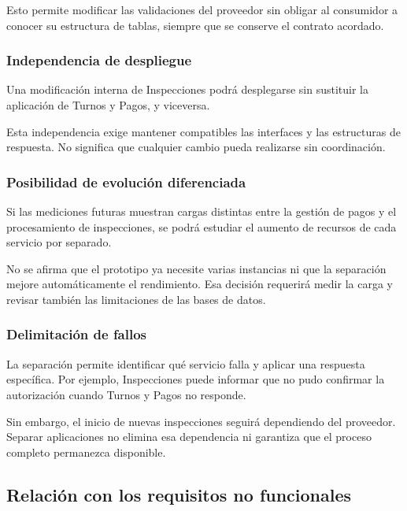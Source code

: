 \documentclass[11pt,a4paper]{article}
\begin{document}
	Esto permite modificar las validaciones del proveedor sin obligar al consumidor a conocer su estructura de tablas, siempre que se conserve el contrato acordado.
	
	\subsubsection{Independencia de despliegue}
	
	Una modificación interna de Inspecciones podrá desplegarse sin sustituir la aplicación de Turnos y Pagos, y viceversa.
	
	Esta independencia exige mantener compatibles las interfaces y las estructuras de respuesta. No significa que cualquier cambio pueda realizarse sin coordinación.
	
	\subsubsection{Posibilidad de evolución diferenciada}
	
	Si las mediciones futuras muestran cargas distintas entre la gestión de pagos y el procesamiento de inspecciones, se podrá estudiar el aumento de recursos de cada servicio por separado.
	
	No se afirma que el prototipo ya necesite varias instancias ni que la separación mejore automáticamente el rendimiento. Esa decisión requerirá medir la carga y revisar también las limitaciones de las bases de datos.
	
	\subsubsection{Delimitación de fallos}
	
	La separación permite identificar qué servicio falla y aplicar una respuesta específica. Por ejemplo, Inspecciones puede informar que no pudo confirmar la autorización cuando Turnos y Pagos no responde.
	
	Sin embargo, el inicio de nuevas inspecciones seguirá dependiendo del proveedor. Separar aplicaciones no elimina esa dependencia ni garantiza que el proceso completo permanezca disponible.
	
	\subsection{Relación con los requisitos no funcionales}
	
\end{document}
